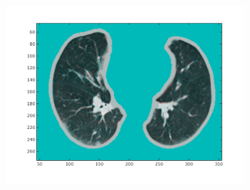 \documentclass[11pt,a4paper,oneside]{report}
\begin{document}
\begin{figure}[H]
\begin{subfigure}[b]{0.3\textwidth}
  \end{subfigure}
  \begin{subfigure}[b]{0.3\textwidth}
	  \includegraphics[width=\textwidth, trim=20 20 20 20]{figures/reg1/reg3_2_49.png}
  \end{subfigure}
  


\end{figure}
\end{document}
